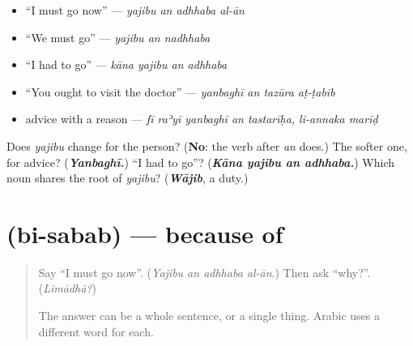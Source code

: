 \begin{itemize}
\raggedright
  \item \textquotedblleft{}I must go now\textquotedblright{} — \emph{yajibu an adhhaba al-ān}
  \item \textquotedblleft{}We must go\textquotedblright{} — \emph{yajibu an nadhhaba}
  \item \textquotedblleft{}I had to go\textquotedblright{} — \emph{kāna yajibu an adhhaba}
  \item \textquotedblleft{}You ought to visit the doctor\textquotedblright{} — \emph{yanbaghī an tazūra aṭ-ṭabīb}
  \item advice with a reason — \emph{fī raʾyī yanbaghī an tastarīḥa, li-annaka marīḍ}
\end{itemize}

\begin{tcolorbox}[breakable,colback=teal!4,colframe=teal!35!black,title={Before you move on}]
Does \emph{yajibu} change for the person? (\textbf{No}: the verb after \emph{an} does.) The softer one, for advice? (\emph{\textbf{Yanbaghī.}}) \textquotedblleft{}I had to go\textquotedblright{}? (\emph{\textbf{Kāna yajibu an adhhaba.}}) Which noun shares the root of \emph{yajibu}? (\emph{\textbf{Wājib}}, a duty.)
\end{tcolorbox}
\section[\texorpdfstring{\ar{بسبب} (bi-sabab)}{بسبب (bi-sabab)}]{ (bi-sabab) — because of}

\label{lesson:AR-C286-bi-sabab}



\begin{quote}
Say \textquotedblleft{}I must go now\textquotedblright{}. (\emph{Yajibu an adhhaba al-ān}.) Then ask \textquotedblleft{}why?\textquotedblright{}. (\emph{Limādhā?})

The answer can be a whole sentence, or a single thing. Arabic uses a different word for each.
\end{quote}

